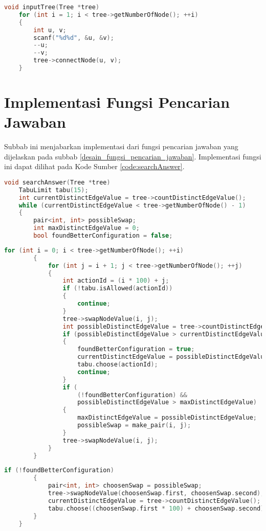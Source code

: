 \begin{lstlisting}[language=C++, caption=Implementasi Fungsi Masukan \textit{Tree}, label=code:inputTree, firstnumber=0]
	void inputTree(Tree *tree)
    for (int i = 1; i < tree->getNumberOfNode(); ++i)
    {
        int u, v;
        scanf("%d%d", &u, &v);
        --u;
        --v;
        tree->connectNode(u, v);
    }
\end{lstlisting}

\section{Implementasi Fungsi Pencarian Jawaban}
Subbab ini menjabarkan implementasi dari fungsi pencarian jawaban yang dijelaskan pada subbab \ref{desain_fungsi_pencarian_jawaban}.  Implementasi fungsi ini dapat dilihat pada Kode Sumber \ref{code:searchAnswer}.

\begin{lstlisting}[language=C++, firstnumber=0]
	void searchAnswer(Tree *tree)
    TabuLimit tabu(15);
    int currentDistinctEdgeValue = tree->countDistinctEdgeValue();
    while (currentDistinctEdgeValue < tree->getNumberOfNode() - 1)
    {
        pair<int, int> possibleSwap;
        int maxDistinctEdgeValue = 0;
		bool foundBetterConfiguration = false;
		\end{lstlisting}
		\pagebreak
		\begin{lstlisting}[language=C++, firstnumber=8]
        for (int i = 0; i < tree->getNumberOfNode(); ++i)
        {
            for (int j = i + 1; j < tree->getNumberOfNode(); ++j)
            {
                int actionId = (i * 100) + j;
                if (!tabu.isAllowed(actionId))
                {
                    continue;
                }
                tree->swapNodeValue(i, j);
                int possibleDistinctEdgeValue = tree->countDistinctEdgeValue();
                if (possibleDistinctEdgeValue > currentDistinctEdgeValue)
                {
                    foundBetterConfiguration = true;
                    currentDistinctEdgeValue = possibleDistinctEdgeValue;
                    tabu.choose(actionId);
                    continue;
				}
                if (
                    (!foundBetterConfiguration) &&
                    possibleDistinctEdgeValue > maxDistinctEdgeValue)
                {
                    maxDistinctEdgeValue = possibleDistinctEdgeValue;
                    possibleSwap = make_pair(i, j);
                }
                tree->swapNodeValue(i, j);
            }
		}
	\end{lstlisting}
	\pagebreak
	\begin{lstlisting}[language=C++, caption=Implementasi Fungsi Masukan \textit{Tree}, label=code:searchAnswer, firstnumber=36]
        if (!foundBetterConfiguration)
        {
            pair<int, int> choosenSwap = possibleSwap;
            tree->swapNodeValue(choosenSwap.first, choosenSwap.second);
            currentDistinctEdgeValue = tree->countDistinctEdgeValue();
            tabu.choose((choosenSwap.first * 100) + choosenSwap.second);
        }
    }
\end{lstlisting}